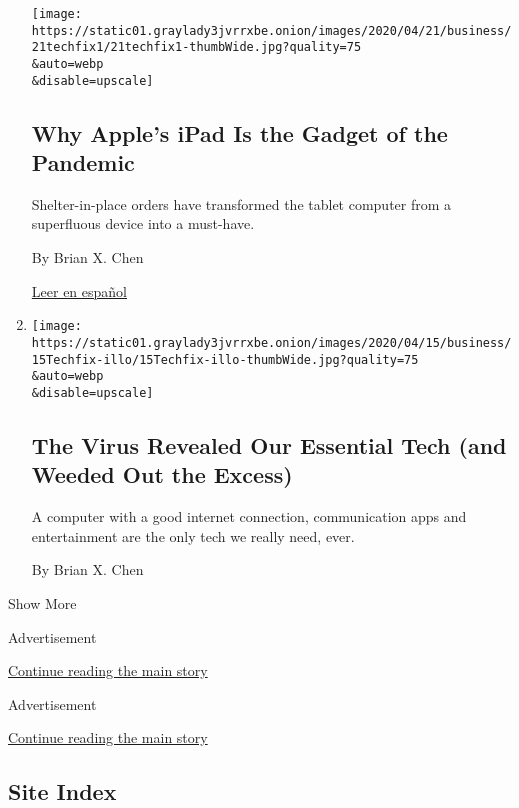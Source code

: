 \begin{enumerate}
  \texttt{[image: https://static01.graylady3jvrrxbe.onion/images/2020/04/21/business/21techfix1/21techfix1-thumbWide.jpg?quality=75\\\&auto=webp\\\&disable=upscale]}

  \hypertarget{why-apples-ipad-is-the-gadget-of-the-pandemic}{%
  \subsection{Why Apple's iPad Is the Gadget of the
  Pandemic}\label{why-apples-ipad-is-the-gadget-of-the-pandemic}}

  Shelter-in-place orders have transformed the tablet computer from a
  superfluous device into a must-have.

  By Brian X. Chen

  \href{https://www.nytimes3xbfgragh.onion/es/2020/04/22/espanol/ciencia-y-tecnologia/ipad-pandemia.html}{Leer
  en español}
\item
  \href{/2020/04/15/technology/personaltech/virus-essential-tech.html}{}

  \texttt{[image: https://static01.graylady3jvrrxbe.onion/images/2020/04/15/business/15Techfix-illo/15Techfix-illo-thumbWide.jpg?quality=75\\\&auto=webp\\\&disable=upscale]}

  \hypertarget{the-virus-revealed-our-essential-tech-and-weeded-out-the-excess}{%
  \subsection{The Virus Revealed Our Essential Tech (and Weeded Out the
  Excess)}\label{the-virus-revealed-our-essential-tech-and-weeded-out-the-excess}}

  A computer with a good internet connection, communication apps and
  entertainment are the only tech we really need, ever.

  By Brian X. Chen
\end{enumerate}

Show More

Advertisement

\protect\hyperlink{after-mid1}{Continue reading the main story}

Advertisement

\protect\hyperlink{after-mktg}{Continue reading the main story}

\hypertarget{site-index}{%
\subsection{Site Index}\label{site-index}}

